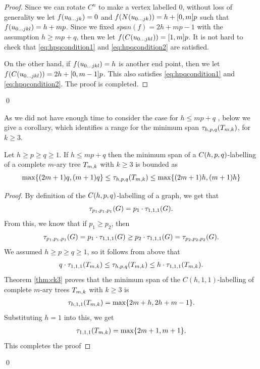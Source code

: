 \begin{proof}
Since we can rotate $C^n$ to make a vertex labelled $0$, without loss of generality we let $f(u_{0\dots jk}) = 0$ and $f(N(u_{0\dots jk})) = h+[0,m]p$ such that $f(u_{0\dots jkl}) = h+mp$. Since we fixed $span(f) = 2h+mp-1$ with the assumption $h \ge mp+q$, then we let $f(C(u_{0\dots jkl}))= [1,m]p$. It is not hard to check that \eqref{eq:hpqcondition1} and \eqref{eq:hpqcondition2} are satisfied.  

On the other hand, if $f(u_{0\dots jkl}) = h$ is another end point, then we let $f(C(u_{0\dots jkl}))=2h+[0,m-1]p$. This also satisfies  \eqref{eq:hpqcondition1} and \eqref{eq:hpqcondition2}. The proof is completed. 
\end{proof}
\qed

As we did not have enough time to consider the case for $h \le mp+q$ , below we give a corollary, which identifies a range for the minimum span $\tau_{h,p,q}(T_{m,k})$, for $k \ge 3$. 

\begin{corollary}
Let $h \ge p \ge q \ge 1$. If $h \le mp+q$ then the minimum span of a $C(h,p,q)$-labelling of a complete $m$-ary tree $T_{m,k}$ with $k \ge 3$ is bounded as 
\begin{align*}
\max\{(2m+1)q, (m+1)q\} \le \tau_{h,p,q}(T_{m,k}) \le \max\{(2m+1)h, (m+1)h\}
\end{align*}
\end{corollary}

\begin{proof}
By definition of the $C(h,p,q)$-labelling of a graph, we get that
\[
\tau_{p_1,p_1,p_1}(G) = p_1\cdot \tau_{1,1,1}(G).
\]
From this, we know that if $p_1 \ge p_2$, then 
\[
\tau_{p_1,p_1,p_1}(G) = p_1 \cdot \tau_{1,1,1}(G) \ge p_2 \cdot \tau_{1,1,1}(G) = \tau_{p_2,p_2,p_2}(G).
\]
We assumed $h \ge p \ge q \ge 1$, so it follows from above that 
\begin{align*}
q\cdot \tau_{1,1,1}(T_{m,k}) \le \tau_{h,p,q}(T_{m,k}) \le h\cdot \tau_{1,1,1}(T_{m,k}).
\end{align*}
Theorem \ref{thm:ck3} proves that the minimum span of the $C(h,1,1)$-labelling of complete $m$-ary trees $T_{m,k}$ with $k \ge 3$ is 
\begin{align*}
\tau_{h,1,1}(T_{m,k}) = \max\{2m+h, 2h+m-1\}.
\end{align*}
Substituting $h = 1$ into this, we get
\begin{align*}
\tau_{1,1,1}(T_{m,k}) = \max\{2m+1, m+1\}.
\end{align*} 
This completes the proof
\end{proof}
\qed






